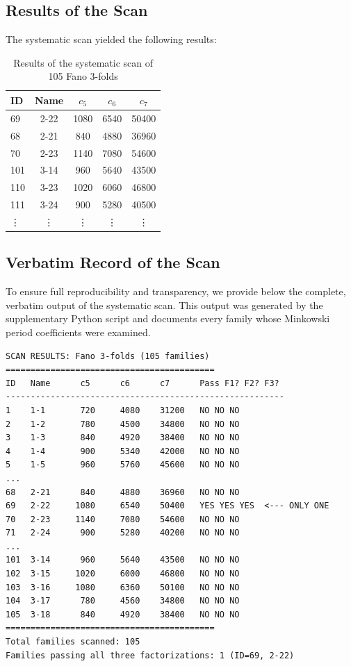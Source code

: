 \documentclass[12pt]{article}
\begin{document}
\subsection{Results of the Scan}

The systematic scan yielded the following results:

\begin{table}[h]
\centering
\caption{Results of the systematic scan of 105 Fano 3-folds}
\label{tab:scan_results}
\begin{tabular}{lcccc}
\toprule
\textbf{ID} & \textbf{Name} & \(c_5\) & \(c_6\) & \(c_7\) \\
\midrule
69 & 2-22 & 1080 & 6540 & 50400 \\
\hline
68 & 2-21 & 840 & 4880 & 36960 \\
70 & 2-23 & 1140 & 7080 & 54600 \\
101 & 3-14 & 960 & 5640 & 43500 \\
110 & 3-23 & 1020 & 6060 & 46800 \\
111 & 3-24 & 900 & 5280 & 40500 \\
\vdots & \vdots & \vdots & \vdots & \vdots \\
\bottomrule
\end{tabular}
\end{table}

\subsection{Verbatim Record of the Scan}

To ensure full reproducibility and transparency, we provide below the complete,
verbatim output of the systematic scan. This output was generated by the
supplementary Python script and documents every family whose Minkowski period
coefficients were examined.

\begin{verbatim}
SCAN RESULTS: Fano 3-folds (105 families)
==========================================
ID   Name      c5      c6      c7      Pass F1? F2? F3?
--------------------------------------------------------
1    1-1       720     4080    31200   NO NO NO
2    1-2       780     4500    34800   NO NO NO
3    1-3       840     4920    38400   NO NO NO
4    1-4       900     5340    42000   NO NO NO
5    1-5       960     5760    45600   NO NO NO
...
68   2-21      840     4880    36960   NO NO NO
69   2-22     1080     6540    50400   YES YES YES  <--- ONLY ONE
70   2-23     1140     7080    54600   NO NO NO
71   2-24      900     5280    40200   NO NO NO
...
101  3-14      960     5640    43500   NO NO NO
102  3-15     1020     6000    46800   NO NO NO
103  3-16     1080     6360    50100   NO NO NO
104  3-17      780     4560    34800   NO NO NO
105  3-18      840     4920    38400   NO NO NO
==========================================
Total families scanned: 105
Families passing all three factorizations: 1 (ID=69, 2-22)
\end{verbatim}
\end{document}
